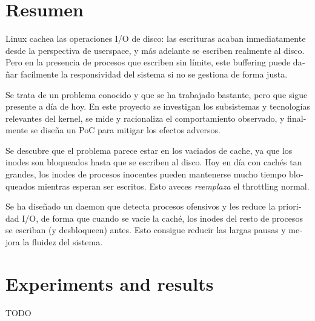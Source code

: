\documentclass[a4paper,12pt]{article}
\begin{document}
\newpage
\section*{Resumen}

\begin{otherlanguage}{spanish}
Linux cachea las operaciones I/O de disco: las escrituras acaban inmediatamente desde la perspectiva de userspace, y más adelante se escriben realmente al disco. Pero en la presencia de procesos que escriben sin límite, este buffering puede dañar facilmente la responsividad del sistema si no se gestiona de forma justa.

Se trata de un problema conocido y que se ha trabajado bastante, pero que sigue presente a día de hoy. En este proyecto se investigan los subsistemas y tecnologías relevantes del kernel, se mide y racionaliza el comportamiento observado, y finalmente se diseña un PoC para mitigar los efectos adversos.

Se descubre que el problema parece estar en los vaciados de cache, ya que los inodes son bloqueados hasta que se escriben al disco. Hoy en día con cachés tan grandes, los inodes de procesos inocentes pueden mantenerse mucho tiempo bloqueados mientras esperan ser escritos. Esto aveces \emph{reemplaza} el throttling normal.

Se ha diseñado un daemon que detecta procesos ofensivos y les reduce la prioridad I/O, de forma que cuando se vacie la caché, los inodes del resto de procesos se escriban (y desbloqueen) antes. Esto consigue reducir las largas pausas y mejora la fluidez del sistema.
\end{otherlanguage}


\newpage
{\hypersetup{linkcolor=black}
\tableofcontents
}

\newpage
{\hypersetup{linkcolor=black}
\listoffigures
\listoflistings
\listoftables
}

\newpage



\newpage


\newpage


\newpage



\clearpage
\section{Experiments and results}
\label{sec:tests}
TODO
\end{document}
